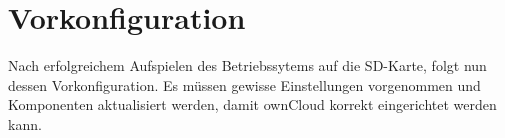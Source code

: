 \section{Vorkonfiguration}
Nach erfolgreichem Aufspielen des Betriebssytems auf die SD-Karte, folgt nun dessen Vorkonfiguration. Es müssen gewisse Einstellungen vorgenommen und Komponenten aktualisiert werden, damit ownCloud korrekt eingerichtet werden kann.


